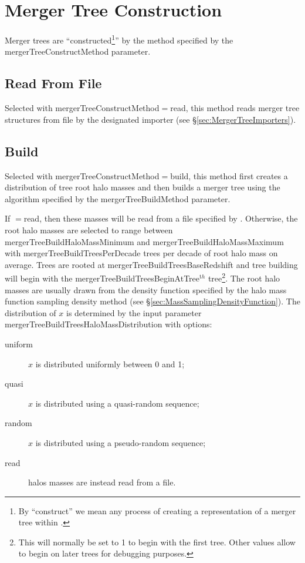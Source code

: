 \section{Merger Tree Construction}

Merger trees are ``constructed\footnote{By ``construct'' we mean any process of creating a representation of a merger tree within \protect\glc.}'' by the method specified by the {\normalfont \ttfamily mergerTreeConstructMethod} parameter.

\subsection{Read From File}

Selected with {\normalfont \ttfamily mergerTreeConstructMethod}$=${\normalfont \ttfamily read}, this method reads merger tree structures from file by the designated importer (see \S\ref{sec:MergerTreeImporters}).

\subsection{Build}

Selected with {\normalfont \ttfamily mergerTreeConstructMethod}$=${\normalfont \ttfamily build}, this method first creates a distribution of tree root halo masses and then builds a merger tree using the algorithm specified by the {\normalfont \ttfamily mergerTreeBuildMethod} parameter.

If {\normalfont \ttfamily [mergerTreeBuildTreesHaloMassDistribution]}$=${\normalfont \ttfamily read}, then these masses will be read from a file specified by {\normalfont \ttfamily [mergerTreeBuildTreeMassesFile]}. Otherwise, the root halo masses are selected to range between {\normalfont \ttfamily mergerTreeBuildHaloMassMinimum} and {\normalfont \ttfamily mergerTreeBuildHaloMassMaximum} with {\normalfont \ttfamily mergerTreeBuildTreesPerDecade} trees per decade of root halo mass on average. Trees are rooted at {\normalfont \ttfamily mergerTreeBuildTreesBaseRedshift} and tree building will begin with the {\normalfont \ttfamily mergerTreeBuildTreesBeginAtTree}$^{\mathrm th}$ tree\footnote{This will normally be set to 1 to begin with the first tree. Other values allow to begin on later trees for debugging purposes.}. The root halo masses are usually drawn from the density function specified by the halo mass function sampling density method (see \S\ref{sec:MassSamplingDensityFunction}). The distribution of $x$ is determined by the input parameter {\normalfont \ttfamily mergerTreeBuildTreesHaloMassDistribution} with options:
\begin{description}
 \item [{\normalfont \ttfamily uniform}] $x$ is distributed uniformly between 0 and 1;
 \item [{\normalfont \ttfamily quasi}] $x$ is distributed using a quasi-random sequence;
 \item [{\normalfont \ttfamily random}] $x$ is distributed using a pseudo-random sequence;
 \item [{\normalfont \ttfamily read}] halos masses are instead read from a file.
\end{description}


